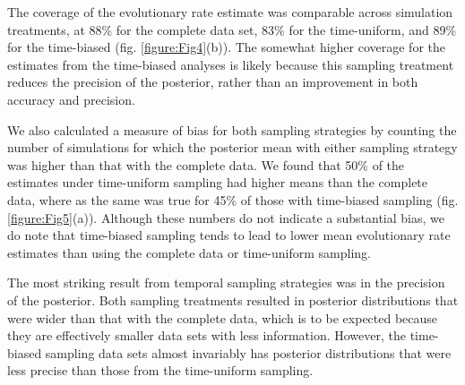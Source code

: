 \documentclass[11pt]{article}
\begin{document}
The coverage of the evolutionary rate estimate was comparable across simulation treatments, at 88\% for the complete data set, 83\% for the time-uniform, and 89\% for the time-biased (fig. \ref{figure:Fig4}(b)). The somewhat higher coverage for the estimates from the time-biased analyses is likely because this sampling treatment reduces the precision of the posterior, rather than an improvement in both accuracy and precision.

We also calculated a measure of bias for both sampling strategies by counting the number of simulations for which the posterior mean with either sampling strategy was higher than that with the complete data. We found that 50\% of the estimates under time-uniform sampling had higher means than the complete data, where as the same was true for 45\% of those with time-biased sampling (fig. \ref{figure:Fig5}(a)). Although these numbers do not indicate a substantial bias, we do note that time-biased sampling tends to lead to lower mean evolutionary rate estimates than using the complete data or time-uniform sampling.

The most striking result from temporal sampling strategies was in the precision of the posterior. Both sampling treatments resulted in posterior distributions that were wider than that with the complete data, which is to be expected because they are effectively smaller data sets with less information. However, the time-biased sampling data sets almost invariably has posterior distributions that were less precise than those from the time-uniform sampling.
\end{document}
